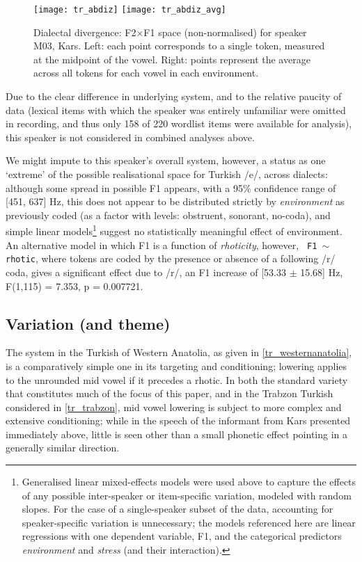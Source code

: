 \begin{figure}[H]
  \centering
  \texttt{[image: tr\_abdiz]}
    \texttt{[image: tr\_abdiz\_avg]}
  \caption[Dialectal divergence: F2$\times$F1 space (non-normalised) for speaker M03, Kars.]{Dialectal divergence: F2$\times$F1 space (non-normalised) for speaker M03, Kars. Left: each point corresponds to a single token, measured at the midpoint of the vowel. Right: points represent the average across all tokens for each vowel in each environment.}
  \label{fig:abdiz}
\end{figure}

Due to the clear difference in underlying system, and to the relative paucity of data (lexical items with which the speaker was entirely unfamiliar were omitted in recording, and thus only 158 of 220 wordlist items were available for analysis), this speaker is not considered in combined analyses above.

We might impute to this speaker's overall system, however, a status as one `extreme' of the possible realisational space for Turkish /e/, across dialects: although some spread in possible F1 appears, with a 95\% confidence range of [451, 637] Hz, this does not appear to be distributed strictly by \emph{environment} as previously coded (as a factor with levels: obstruent, sonorant, no-coda), and simple linear models\footnote{Generalised linear mixed-effects models were used above to capture the effects of any possible inter-speaker or item-specific variation, modeled with random slopes. For the case of a single-speaker subset of the data, accounting for speaker-specific variation is unnecessary; the models referenced here are linear regressions with one dependent variable, F1, and the categorical predictors \emph{environment} and \emph{stress} (and their interaction).} suggest no statistically meaningful effect of environment. An alternative model in which F1 is a function of \emph{rhoticity}, however, \texttt{ F1 $\sim$ rhotic}, where tokens are coded by the presence or absence of a following /r/ coda, gives a significant effect due to /r/, an F1 increase of [53.33 $\pm$ 15.68] Hz, F(1,115) = 7.353, p = 0.007721.

\subsection{Variation (and theme)}\label{ss:trvariation}

The system in the Turkish of Western Anatolia, as given in \cref{tr_westernanatolia}, is a comparatively simple one in its targeting and conditioning; lowering applies to the unrounded mid vowel if it precedes a rhotic. In both the standard variety that constitutes much of the focus of this paper, and in the Trabzon Turkish considered in \cref{tr_trabzon}, mid vowel lowering is subject to more complex and extensive conditioning; while in the speech of the informant from Kars presented immediately above, little is seen other than a small phonetic effect pointing in a generally similar direction.

